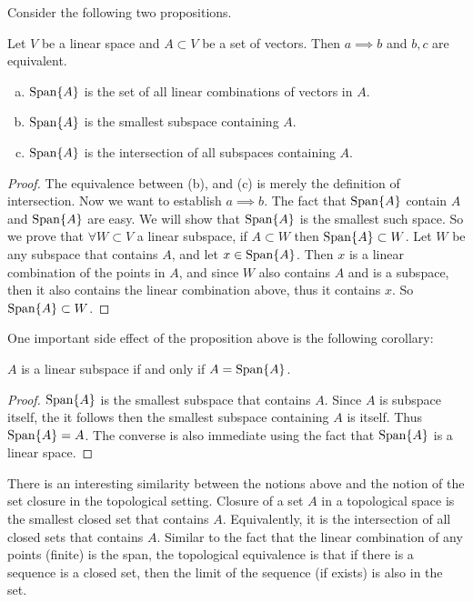  \begin{summary}
 	Consider the following two propositions.
 	\begin{proposition}
 		Let $ V $ be a linear space and $ A\subset V $ be a set of vectors. Then $ a \implies b $ and $ b,c $ are equivalent.
 		\begin{enumerate}[(a)]
 			\item $ \operatorname{Span}\{A\} $ is the set of all linear combinations of vectors in $ A $.
 			\item $ \operatorname{Span}\{A\} $ is the smallest subspace containing $ A $.
 			\item $ \operatorname{Span}\{A\} $ is the intersection of all subspaces containing $ A $.
 		\end{enumerate}
 		\begin{proof}
 			The equivalence between (b), and (c) is merely the definition of intersection. Now we want to establish $ a\implies b $. The fact that $ \operatorname{Span}\{A\} $ contain $ A $ and $ \operatorname{Span}\{A\} $ are easy. We will show that $ \operatorname{Span}\{A\} $ is the smallest such space. So we prove that $ \forall W \subset V $ a linear subspace, if $ A \subset W $ then $ \operatorname{Span}\{A\} \subset W $. Let $ W $ be any subspace that contains $ A $, and let $ x \in \operatorname{Span}\{A\} $. Then $ x $ is a linear combination of the points in $ A $, and since $ W $ also contains $ A $ and is a subspace, then it also contains the linear combination above, thus it contains $ x $. So $ \operatorname{Span}\{A\} \subset W $.
 		\end{proof}
 	\end{proposition}
 	One important side effect of the proposition above is the following corollary:
 	\begin{corollary}
 		$ A $ is a linear subspace if and only if $ A = \operatorname{Span}\{A\} $.
 		\begin{proof}
 			$ \operatorname{Span}\{A\} $ is the smallest subspace that contains $ A $. Since $ A $ is subspace itself, the it follows then the smallest subspace containing $ A $ is itself. Thus $ \operatorname{Span}\{A\} = A $. The converse is also immediate using the fact that $ \operatorname{Span}\{A\} $ is a linear space.
 		\end{proof}
 	\end{corollary}
 	There is an interesting similarity between the notions above and the notion of the set closure in the topological setting. Closure of a set $ A $ in a topological space is the smallest closed set that contains $ A $. Equivalently, it is the intersection of all closed sets that contains $ A $. Similar to the fact that the linear combination of any points (finite) is the span, the topological equivalence is that if there is a sequence is a closed set, then the limit of the sequence (if exists) is also in the set.
 \end{summary}
 
